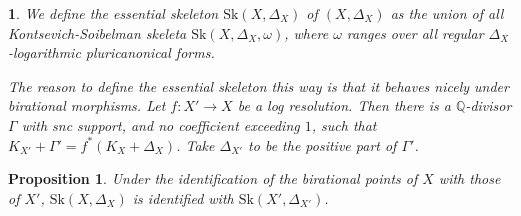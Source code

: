 \documentclass{amsart}%
\numberwithin{equation}{subsection}
\theoremstyle{plain2}
\newtheorem{prop}[equation]{Proposition}
\theoremstyle{definition2}
\theoremstyle{stepstyle}
\theoremstyle{point}
\theoremstyle{subpoint}
\newtheorem{subpoint}[equation]{}%
\newcommand{\spa}[1]{\begin{subpoint}#1\end{subpoint}}           %
\newcommand{\Sk}{\mathrm{Sk}}
\begin{document}
\spa{We define the essential skeleton $\Sk(X,\Delta_X)$ of $(X,\Delta_X)$ as the union of all Kontsevich-Soibelman skeleta $\Sk(X, \Delta_X,\omega)$, where $\omega$ ranges over all regular $\Delta_X$-logarithmic pluricanonical forms. 

The reason to define the essential skeleton this way is that it behaves nicely under birational morphisms. Let $f \colon X'\to X$ be a log resolution. Then there is a $\mathbb{Q}$-divisor $\Gamma$ with snc support, and no coefficient exceeding $1$, such that $K_{X'}+\Gamma' = f^*(K_X+\Delta_X)$. Take $\Delta_{X'}$ to be the positive part of $\Gamma'$.}
\begin{prop} \label{prop birational invariance essential skeleton for pairs}
Under the identification of the birational points of $X$ with those of $X'$, $\Sk(X, \Delta_X)$ is identified with $\Sk(X', \Delta_{X'})$.
\end{prop}
\end{document}
